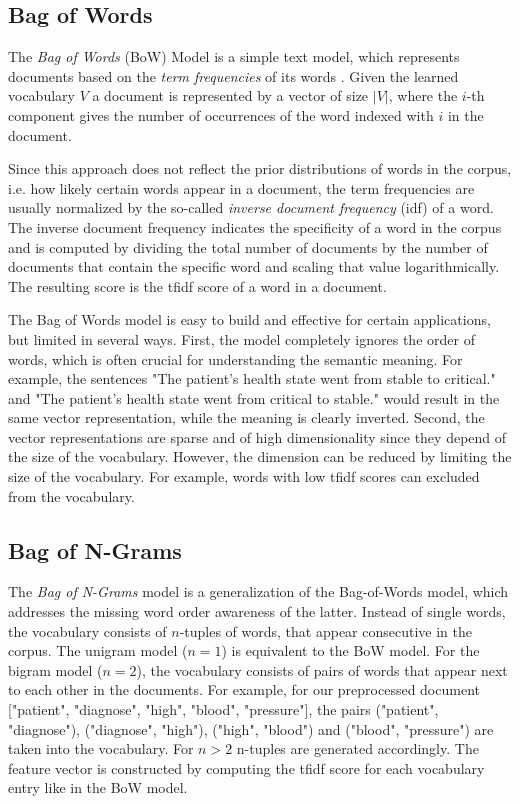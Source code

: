 \subsection{Bag of Words}

The \textit{Bag of Words} (BoW) Model is a simple text model, which represents documents based on the \textit{term frequencies} of its words \cite{harris1954distributional}.
Given the learned vocabulary $V$ a document is represented by a vector of size $|V|$, where the $i$-th component gives the number of occurrences of the word indexed with $i$ in the document.

Since this approach does not reflect the prior distributions of words in the corpus, i.e. how likely certain words appear in a document, the term frequencies are usually normalized by the so-called \textit{inverse document frequency} (idf) of a word.
The inverse document frequency indicates the specificity of a word in the corpus and is computed by dividing the total number of documents by the number of documents that contain the specific word and scaling that value logarithmically.
The resulting score is the tfidf score of a word in a document.


The Bag of Words model is easy to build and effective for certain applications, but limited in several ways.
First, the model completely ignores the order of words, which is often crucial for understanding the semantic meaning. For example, the sentences "The patient's health state went from stable to critical." and "The patient's health state went from critical to stable." would result in the same vector representation, while the meaning is clearly inverted.
Second, the vector representations are sparse and of high dimensionality since they depend of the size of the vocabulary.
However, the dimension can be reduced by limiting the size of the vocabulary. For example, words with low tfidf scores can excluded from the vocabulary.


\subsection{Bag of N-Grams}

The \textit{Bag of N-Grams} model is a generalization of the Bag-of-Words model, which addresses the missing word order awareness of the latter.
Instead of single words, the vocabulary consists of $n$-tuples of words, that appear consecutive in the corpus.
The unigram model ($n=1$) is equivalent to the BoW model.
For the bigram model ($n=2$), the vocabulary consists of pairs of words that appear next to each other in the documents.
For example, for our preprocessed document ["patient", "diagnose", "high", "blood", "pressure"], the pairs ("patient", "diagnose"), ("diagnose", "high"), ("high", "blood") and ("blood", "pressure") are taken into the vocabulary.
For $n>2$ n-tuples are generated accordingly.
The feature vector is constructed by computing the tfidf score for each vocabulary entry like in the BoW model.

